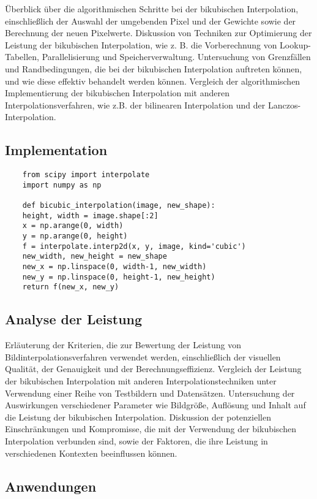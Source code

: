     Überblick über die algorithmischen Schritte bei der bikubischen Interpolation, einschließlich der Auswahl der umgebenden Pixel und der Gewichte sowie der Berechnung der neuen Pixelwerte.
    Diskussion von Techniken zur Optimierung der Leistung der bikubischen Interpolation, wie z. B. die Vorberechnung von Lookup-Tabellen, Parallelisierung und Speicherverwaltung.
    Untersuchung von Grenzfällen und Randbedingungen, die bei der bikubischen Interpolation auftreten können, und wie diese effektiv behandelt werden können.
    Vergleich der algorithmischen Implementierung der bikubischen Interpolation mit anderen Interpolationsverfahren, wie z.B. der bilinearen Interpolation und der Lanczos-Interpolation.

    \subsection{Implementation}
    \begin{lstlisting}
    from scipy import interpolate
    import numpy as np

    def bicubic_interpolation(image, new_shape):
    height, width = image.shape[:2]
    x = np.arange(0, width)
    y = np.arange(0, height)
    f = interpolate.interp2d(x, y, image, kind='cubic')
    new_width, new_height = new_shape
    new_x = np.linspace(0, width-1, new_width)
    new_y = np.linspace(0, height-1, new_height)
    return f(new_x, new_y)
    \end{lstlisting}
    \subsection{Analyse der Leistung}

    Erläuterung der Kriterien, die zur Bewertung der Leistung von Bildinterpolationsverfahren verwendet werden, einschließlich der visuellen Qualität, der Genauigkeit und der Berechnungseffizienz.
    Vergleich der Leistung der bikubischen Interpolation mit anderen Interpolationstechniken unter Verwendung einer Reihe von Testbildern und Datensätzen.
    Untersuchung der Auswirkungen verschiedener Parameter wie Bildgröße, Auflösung und Inhalt auf die Leistung der bikubischen Interpolation.
    Diskussion der potenziellen Einschränkungen und Kompromisse, die mit der Verwendung der bikubischen Interpolation verbunden sind, sowie der Faktoren, die ihre Leistung in verschiedenen Kontexten beeinflussen können.

    \subsection{Anwendungen}

